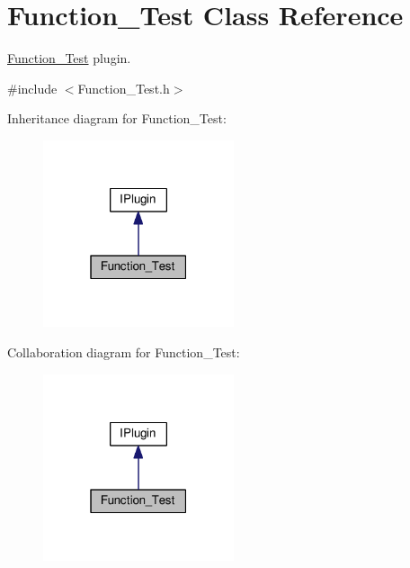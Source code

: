 \hypertarget{class_function___test}{}\section{Function\+\_\+\+Test Class Reference}
\label{class_function___test}


\hyperlink{class_function___test}{Function\+\_\+\+Test} plugin.  




{\ttfamily \#include $<$Function\+\_\+\+Test.\+h$>$}



Inheritance diagram for Function\+\_\+\+Test\+:\nopagebreak
\begin{figure}[H]
\begin{center}
\leavevmode
\includegraphics[width=159pt]{class_function___test__inherit__graph}
\end{center}
\end{figure}


Collaboration diagram for Function\+\_\+\+Test\+:\nopagebreak
\begin{figure}[H]
\begin{center}
\leavevmode
\includegraphics[width=159pt]{class_function___test__coll__graph}
\end{center}
\end{figure}
